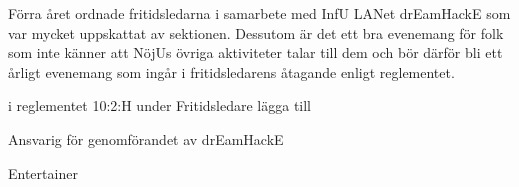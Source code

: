 \documentclass[../_main/handlingar.tex]{subfiles}
\begin{document}

Förra året ordnade fritidsledarna i samarbete med InfU LANet drEamHackE som var mycket uppskattat av sektionen. Dessutom är det ett bra evenemang för folk som inte känner att NöjUs övriga aktiviteter talar till dem och bör därför bli ett årligt evenemang som ingår i fritidsledarens åtagande enligt reglementet.  


\begin{attsatser}
    \att i reglementet 10:2:H under Fritidsledare lägga till 
    \begin{dashlist}
        \item Ansvarig för genomförandet av drEamHackE
      \end{dashlist}

\end{attsatser}

\begin{signatures}{1}
    \ist
    \signature{\ent}{Entertainer}
\end{signatures}
\end{document}
